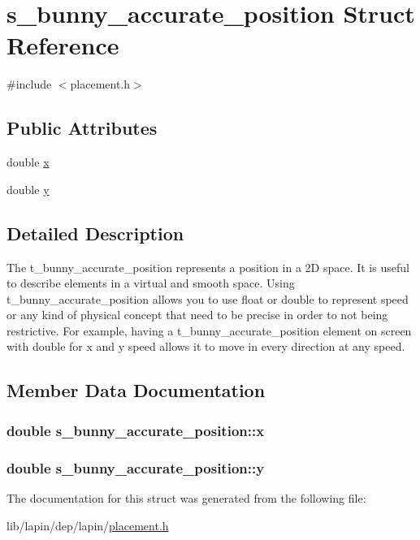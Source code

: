 \hypertarget{structs__bunny__accurate__position}{\section{s\-\_\-bunny\-\_\-accurate\-\_\-position Struct Reference}
\label{structs__bunny__accurate__position}
}


{\ttfamily \#include $<$placement.\-h$>$}

\subsection*{Public Attributes}
\begin{DoxyCompactItemize}
\item 
double \hyperlink{structs__bunny__accurate__position_a72c6ba3b685e96e1ab8bef967aeba5b6}{x}
\item 
double \hyperlink{structs__bunny__accurate__position_a4d25d3d4d190bc90aead6ef36417ef62}{y}
\end{DoxyCompactItemize}


\subsection{Detailed Description}
The t\-\_\-bunny\-\_\-accurate\-\_\-position represents a position in a 2\-D space. It is useful to describe elements in a virtual and smooth space. Using t\-\_\-bunny\-\_\-accurate\-\_\-position allows you to use float or double to represent speed or any kind of physical concept that need to be precise in order to not being restrictive. For example, having a t\-\_\-bunny\-\_\-accurate\-\_\-position element on screen with double for x and y speed allows it to move in every direction at any speed. 

\subsection{Member Data Documentation}
\hypertarget{structs__bunny__accurate__position_a72c6ba3b685e96e1ab8bef967aeba5b6}{
\subsubsection[{x}]{\setlength{\rightskip}{0pt plus 5cm}double s\-\_\-bunny\-\_\-accurate\-\_\-position\-::x}}\label{structs__bunny__accurate__position_a72c6ba3b685e96e1ab8bef967aeba5b6}
\hypertarget{structs__bunny__accurate__position_a4d25d3d4d190bc90aead6ef36417ef62}{
\subsubsection[{y}]{\setlength{\rightskip}{0pt plus 5cm}double s\-\_\-bunny\-\_\-accurate\-\_\-position\-::y}}\label{structs__bunny__accurate__position_a4d25d3d4d190bc90aead6ef36417ef62}


The documentation for this struct was generated from the following file\-:\begin{DoxyCompactItemize}
\item 
lib/lapin/dep/lapin/\hyperlink{placement_8h}{placement.\-h}\end{DoxyCompactItemize}
